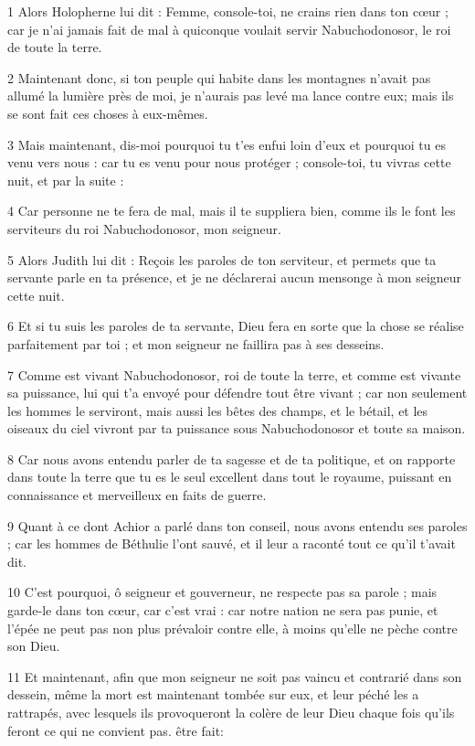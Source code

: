 \par 1 Alors Holopherne lui dit : Femme, console-toi, ne crains rien dans ton cœur ; car je n'ai jamais fait de mal à quiconque voulait servir Nabuchodonosor, le roi de toute la terre.
\par 2 Maintenant donc, si ton peuple qui habite dans les montagnes n'avait pas allumé la lumière près de moi, je n'aurais pas levé ma lance contre eux; mais ils se sont fait ces choses à eux-mêmes.
\par 3 Mais maintenant, dis-moi pourquoi tu t'es enfui loin d'eux et pourquoi tu es venu vers nous : car tu es venu pour nous protéger ; console-toi, tu vivras cette nuit, et par la suite :
\par 4 Car personne ne te fera de mal, mais il te suppliera bien, comme ils le font les serviteurs du roi Nabuchodonosor, mon seigneur.
\par 5 Alors Judith lui dit : Reçois les paroles de ton serviteur, et permets que ta servante parle en ta présence, et je ne déclarerai aucun mensonge à mon seigneur cette nuit.
\par 6 Et si tu suis les paroles de ta servante, Dieu fera en sorte que la chose se réalise parfaitement par toi ; et mon seigneur ne faillira pas à ses desseins.
\par 7 Comme est vivant Nabuchodonosor, roi de toute la terre, et comme est vivante sa puissance, lui qui t'a envoyé pour défendre tout être vivant ; car non seulement les hommes le serviront, mais aussi les bêtes des champs, et le bétail, et les oiseaux du ciel vivront par ta puissance sous Nabuchodonosor et toute sa maison.
\par 8 Car nous avons entendu parler de ta sagesse et de ta politique, et on rapporte dans toute la terre que tu es le seul excellent dans tout le royaume, puissant en connaissance et merveilleux en faits de guerre.
\par 9 Quant à ce dont Achior a parlé dans ton conseil, nous avons entendu ses paroles ; car les hommes de Béthulie l'ont sauvé, et il leur a raconté tout ce qu'il t'avait dit.
\par 10 C'est pourquoi, ô seigneur et gouverneur, ne respecte pas sa parole ; mais garde-le dans ton cœur, car c'est vrai : car notre nation ne sera pas punie, et l'épée ne peut pas non plus prévaloir contre elle, à moins qu'elle ne pèche contre son Dieu.
\par 11 Et maintenant, afin que mon seigneur ne soit pas vaincu et contrarié dans son dessein, même la mort est maintenant tombée sur eux, et leur péché les a rattrapés, avec lesquels ils provoqueront la colère de leur Dieu chaque fois qu'ils feront ce qui ne convient pas. être fait:
